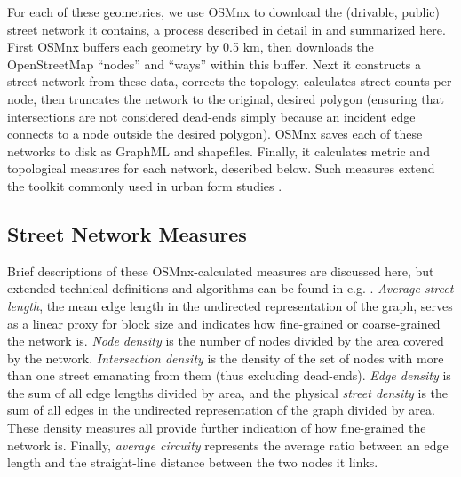 \documentclass{article}
\begin{document}
For each of these geometries, we use OSMnx to download the (drivable, public) street network it contains, a process described in detail in \cite{boeing_osmnx:_2017} and summarized here. First OSMnx buffers each geometry by 0.5 km, then downloads the OpenStreetMap \enquote{nodes} and \enquote{ways} within this buffer. Next it constructs a street network from these data, corrects the topology, calculates street counts per node, then truncates the network to the original, desired polygon (ensuring that intersections are not considered dead-ends simply because an incident edge connects to a node outside the desired polygon). OSMnx saves each of these networks to disk as GraphML and shapefiles. Finally, it calculates metric and topological measures for each network, described below. Such measures extend the toolkit commonly used in urban form studies \cite{talen_measuring_2003, ewing_travel_2010}.

\subsection{Street Network Measures}

Brief descriptions of these OSMnx-calculated measures are discussed here, but extended technical definitions and algorithms can be found in e.g. \cite{trudeau_introduction_1994, albert_statistical_2002, dorogovtsev_evolution_2002, brandes_network_2005, costa_characterization_2007, newman_structure_2003, newman_networks:_2010, barthelemy_spatial_2011, cranmer_navigating_2017}. \emph{Average street length}, the mean edge length in the undirected representation of the graph, serves as a linear proxy for block size and indicates how fine-grained or coarse-grained the network is. \emph{Node density} is the number of nodes divided by the area covered by the network. \emph{Intersection density} is the density of the set of nodes with more than one street emanating from them (thus excluding dead-ends). \emph{Edge density} is the sum of all edge lengths divided by area, and the physical \emph{street density} is the sum of all edges in the undirected representation of the graph divided by area. These density measures all provide further indication of how fine-grained the network is. Finally, \emph{average circuity} represents the average ratio between an edge length and the straight-line distance between the two nodes it links.
\end{document}
